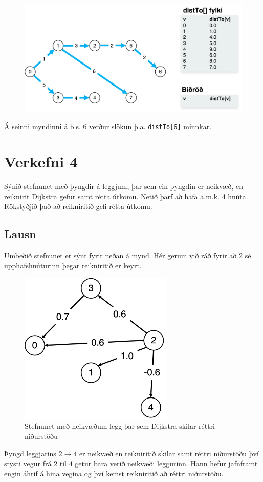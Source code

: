 \documentclass[12pt, a4paper, hidelinks]{article}
\begin{document}
\begin{figure}[H]
    \centering
    \includegraphics[width=\textwidth]{HD11/pdf/img/dijkstra/im10.png}
    \label{fig:dijkstra10}
\end{figure}

\noindent
Á seinni myndinni á bls. 6 verður slökun þ.a. \texttt{distTo[6]} minnkar.

\newpage

\section*{Verkefni 4}
Sýnið stefnunet með þyngdir á leggjum, þar sem ein þyngdin er neikvæð, en
reiknirit Dijkstra gefur samt rétta útkomu. Netið þarf að hafa a.m.k. 4 hnúta.
Rökstyðjið það að reikniritið gefi rétta útkomu.

\subsection*{Lausn}
Umbeðið stefnunet er sýnt fyrir neðan á mynd. Hér gerum við ráð fyrir að $2$ sé upphafshnúturinn þegar reikniritið er keyrt.

\begin{figure}[H]
    \centering
    \includegraphics[width=0.65\textwidth]{HD11/pdf/img/dijkstra/dijkstra-negative-correct.png}
    \caption{Stefnunet með neikvæðum legg þar sem Dijkstra skilar réttri niðurstöðu}
    \label{fig:dijkstra-negative}
\end{figure}

\noindent
Þyngd leggjarins $2 \to 4$ er neikvæð en reikniritið skilar samt réttri niðurstöðu því stysti vegur frá $2$ til $4$ getur bara verið neikvæði leggurinn. Hann hefur jafnframt engin áhrif á hina vegina og því kemst reikniritið að réttri niðurstöðu.
\end{document}
